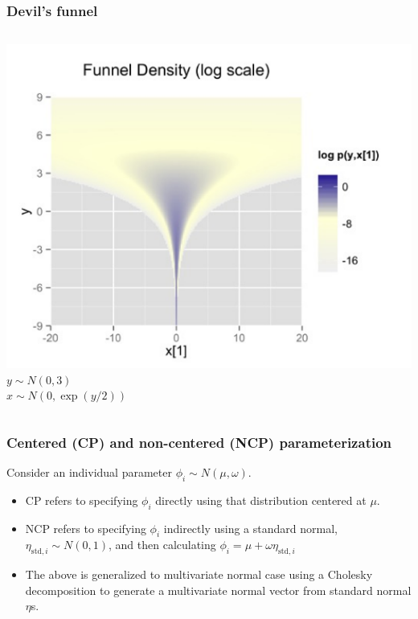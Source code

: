 \documentclass[handout]{beamer}
\begin{document}
\begin{frame}
  \frametitle{Devil's funnel}

\begin{columns}
  \includegraphics[width=\textwidth]{graphics/devils-funnel.pdf}
  $y \sim N(0, 3)$\\
  $x \sim N(0, \exp(y/2))$
\end{columns}

\end{frame}

\begin{frame}
  \frametitle{Centered (CP) and non-centered (NCP) parameterization}
  
Consider an individual parameter $\phi_i \sim N(\mu, \omega)$.
\begin{itemize}
\item CP refers to specifying $\phi_i$ directly using that distribution
  centered at $\mu$.
\item NCP refers to specifying $\phi_i$ indirectly using a standard
  normal, $\eta_{\text{std},i} \sim N(0, 1)$, and
  then calculating $\phi_i = \mu + \omega \eta_{\text{std},i}$
\item The above is generalized  to multivariate normal case using a
  Cholesky decomposition to generate a multivariate normal vector from
  standard normal $\eta$s.
\end{itemize}

\end{frame}
\end{document}
